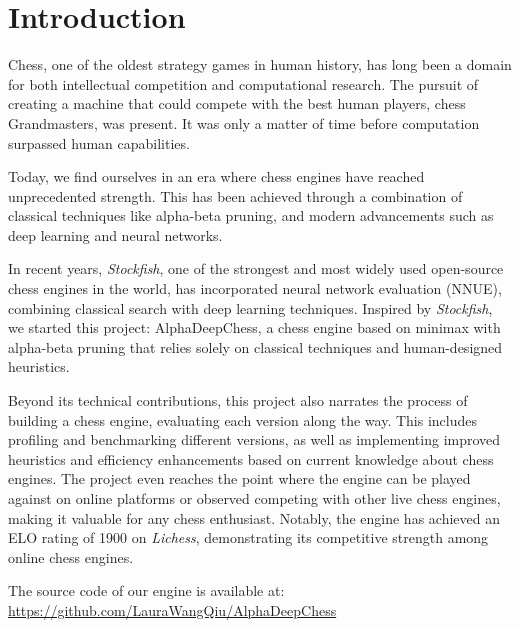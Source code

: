 \chapter{Introduction}\label{cap:introduction}
\renewcommand{\figurename}{Figure}

Chess, one of the oldest strategy games in human history, has long been a domain for both intellectual competition and computational research. The pursuit of creating a machine that could compete with the best human players, chess Grandmasters, was present. It was only a matter of time before computation surpassed human capabilities.

\vspace{1em}

\noindent Today, we find ourselves in an era where chess engines have reached unprecedented strength. This has been achieved through a combination of classical techniques like alpha-beta pruning, and modern advancements such as deep learning and neural networks.

\vspace{1em}

\noindent In recent years, \textit{Stockfish}, one of the strongest and most widely used open-source chess engines in the world, has incorporated neural network evaluation (NNUE), combining classical search with deep learning techniques. Inspired by \textit{Stockfish}, we started this project: AlphaDeepChess, a chess engine based on minimax with alpha-beta pruning that relies solely on classical techniques and human-designed heuristics.

\vspace{1em}

\noindent Beyond its technical contributions, this project also narrates the process of building a chess engine, evaluating each version along the way. This includes profiling and benchmarking different versions, as well as implementing improved heuristics and efficiency enhancements based on current knowledge about chess engines. The project even reaches the point where the engine can be played against on online platforms or observed competing with other live chess engines, making it valuable for any chess enthusiast. Notably, the engine has achieved an ELO rating of 1900 on \textit{Lichess}, demonstrating its competitive strength among online chess engines.

\vspace{1em}

\noindent The source code of our engine is available at:\\
\url{https://github.com/LauraWangQiu/AlphaDeepChess}

